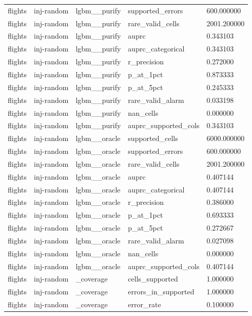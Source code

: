 \begin{tabular}{lllll}
flights & inj-random & lgbm\_\_purify & supported\_errors & 600.000000 \\
flights & inj-random & lgbm\_\_purify & rare\_valid\_cells & 2001.200000 \\
flights & inj-random & lgbm\_\_purify & auprc & 0.343103 \\
flights & inj-random & lgbm\_\_purify & auprc\_categorical & 0.343103 \\
flights & inj-random & lgbm\_\_purify & r\_precision & 0.272000 \\
flights & inj-random & lgbm\_\_purify & p\_at\_1pct & 0.873333 \\
flights & inj-random & lgbm\_\_purify & p\_at\_5pct & 0.245333 \\
flights & inj-random & lgbm\_\_purify & rare\_valid\_alarm & 0.033198 \\
flights & inj-random & lgbm\_\_purify & nan\_cells & 0.000000 \\
flights & inj-random & lgbm\_\_purify & auprc\_supported\_cols & 0.343103 \\
flights & inj-random & lgbm\_\_oracle & supported\_cells & 6000.000000 \\
flights & inj-random & lgbm\_\_oracle & supported\_errors & 600.000000 \\
flights & inj-random & lgbm\_\_oracle & rare\_valid\_cells & 2001.200000 \\
flights & inj-random & lgbm\_\_oracle & auprc & 0.407144 \\
flights & inj-random & lgbm\_\_oracle & auprc\_categorical & 0.407144 \\
flights & inj-random & lgbm\_\_oracle & r\_precision & 0.386000 \\
flights & inj-random & lgbm\_\_oracle & p\_at\_1pct & 0.693333 \\
flights & inj-random & lgbm\_\_oracle & p\_at\_5pct & 0.272667 \\
flights & inj-random & lgbm\_\_oracle & rare\_valid\_alarm & 0.027098 \\
flights & inj-random & lgbm\_\_oracle & nan\_cells & 0.000000 \\
flights & inj-random & lgbm\_\_oracle & auprc\_supported\_cols & 0.407144 \\
flights & inj-random & \_coverage & cells\_supported & 1.000000 \\
flights & inj-random & \_coverage & errors\_in\_supported & 1.000000 \\
flights & inj-random & \_coverage & error\_rate & 0.100000 \\

\end{tabular}

